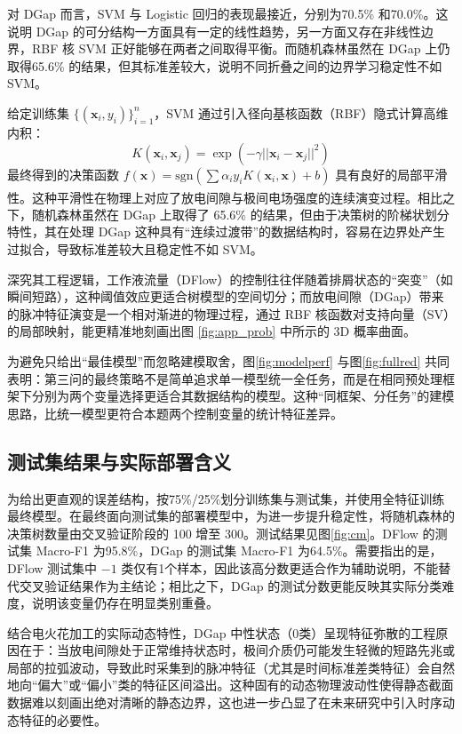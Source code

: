 \documentclass[UTF8,a4paper,12pt]{ctexart}
\newcommand{\upcite}[1]{\textsuperscript{\cite{#1}}}
\begin{document}
对 DGap 而言，SVM 与 Logistic 回归的表现最接近，分别为70.5\% 和70.0\%。这说明 DGap 的可分结构一方面具有一定的线性趋势，另一方面又存在非线性边界，RBF 核 SVM 正好能够在两者之间取得平衡。而随机森林虽然在 DGap 上仍取得65.6\% 的结果，但其标准差较大，说明不同折叠之间的边界学习稳定性不如 SVM。

给定训练集 $\{(\mathbf{x}_i, y_i)\}_{i=1}^n$，SVM 通过引入径向基核函数（RBF）隐式计算高维内积：
\begin{equation}
    K(\mathbf{x}_i, \mathbf{x}_j) = \exp \left( -\gamma ||\mathbf{x}_i - \mathbf{x}_j||^2 \right)
\end{equation}
最终得到的决策函数 $f(\mathbf{x}) = \text{sgn} (\sum \alpha_i y_i K(\mathbf{x}_i, \mathbf{x}) + b)$ 具有良好的局部平滑性\upcite{ref4}。这种平滑性在物理上对应了放电间隙与极间电场强度的连续演变过程。相比之下，随机森林虽然在 DGap 上取得了 65.6\% 的结果，但由于决策树的阶梯状划分特性，其在处理 DGap 这种具有“连续过渡带”的数据结构时，容易在边界处产生过拟合，导致标准差较大且稳定性不如 SVM。

深究其工程逻辑，工作液流量（DFlow）的控制往往伴随着排屑状态的“突变”（如瞬间短路），这种阈值效应更适合树模型的空间切分；而放电间隙（DGap）带来的脉冲特征演变是一个相对渐进的物理过程，通过 RBF 核函数对支持向量（SV）的局部映射，能更精准地刻画出图 \ref{fig:app_prob} 中所示的 3D 概率曲面。

为避免只给出“最佳模型”而忽略建模取舍，图\ref{fig:modelperf} 与图\ref{fig:fullred} 共同表明：第三问的最终策略不是简单追求单一模型统一全任务，而是在相同预处理框架下分别为两个变量选择更适合其数据结构的模型。这种“同框架、分任务”的建模思路，比统一模型更符合本题两个控制变量的统计特征差异。

\subsection{测试集结果与实际部署含义}

为给出更直观的误差结构，按75\%/25\%划分训练集与测试集，并使用全特征训练最终模型。在最终面向测试集的部署模型中，为进一步提升稳定性，将随机森林的决策树数量由交叉验证阶段的 100 增至 300。测试结果见图\ref{fig:cm}。DFlow 的测试集 Macro-F1 为95.8\%，DGap 的测试集 Macro-F1 为64.5\%。需要指出的是，DFlow 测试集中 $-1$ 类仅有1个样本，因此该高分数更适合作为辅助说明，不能替代交叉验证结果作为主结论；相比之下，DGap 的测试分数更能反映其实际分类难度，说明该变量仍存在明显类别重叠。

结合电火花加工的实际动态特性，DGap 中性状态（0类）呈现特征弥散的工程原因在于：当放电间隙处于正常维持状态时，极间介质仍可能发生轻微的短路先兆或局部的拉弧波动，导致此时采集到的脉冲特征（尤其是时间标准差类特征）会自然地向“偏大”或“偏小”类的特征区间溢出。这种固有的动态物理波动性使得静态截面数据难以刻画出绝对清晰的静态边界，这也进一步凸显了在未来研究中引入时序动态特征的必要性。
\end{document}
